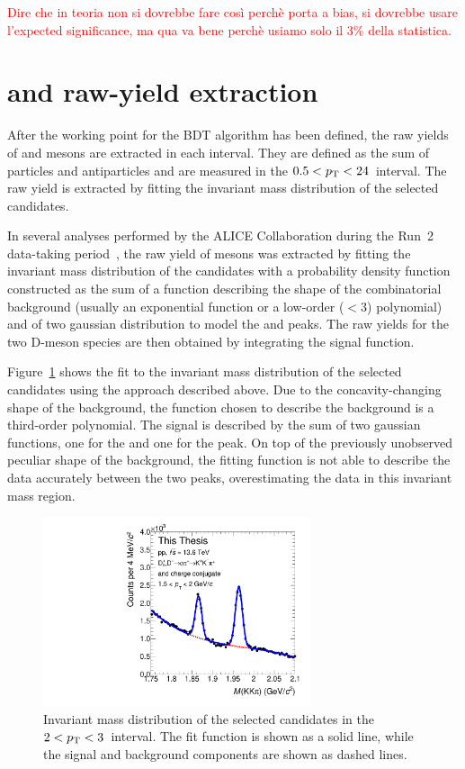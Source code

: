 \textcolor{red}{Dire che in teoria non si dovrebbe fare così perchè porta a bias, si dovrebbe usare l'expected significance, ma qua va bene perchè usiamo solo il 3\% della statistica.}
\section{\texorpdfstring{\ds and \dpl raw-yield extraction}{Ds+ and D+ raw-yield extraction}}

After the working point for the BDT algorithm has been defined, the raw yields of \ds and \dpl mesons are extracted in each \pt interval. They are defined as the sum of particles and antiparticles and are measured in the $0.5<p_\mathrm{T}<24$~\gevc interval. The raw yield is extracted by fitting the invariant mass distribution of the selected candidates. 

In several analyses performed by the ALICE Collaboration during the Run~2 data-taking period~\cite{ALICE:2021mgk,ALICE:2023sgl,ALICE:2021kfc}, the raw yield of \ds mesons was extracted by fitting the invariant mass distribution of the candidates with a probability density function constructed as the sum of a function describing the shape of the combinatorial background (usually an exponential function or a low-order ($<3$) polynomial) and of two gaussian distribution to model the \ds and \dpl peaks. The raw yields for the two D-meson species are then obtained by integrating the signal function. 

Figure~\ref{fig:old_fit} shows the fit to the invariant mass distribution of the selected candidates using the approach described above. Due to the concavity-changing shape of the background, the function chosen to describe the background is a third-order polynomial. The signal is described by the sum of two gaussian functions, one for the \ds and one for the \dpl peak. On top of the previously unobserved peculiar shape of the background, the fitting function is not able to describe the data accurately between the two peaks, overestimating the data in this invariant mass region.
\begin{figure}[htb]
    \centering
    \includegraphics[width=0.7\textwidth]{Figures/Chapter 5/InvMassFitDs1p5_2.pdf}
    \caption{Invariant mass distribution of the selected candidates in the $2<p_\mathrm{T}<3$~\gevc interval. The fit function is shown as a solid line, while the signal and background components are shown as dashed lines.}
    \label{fig:old_fit}
\end{figure}

